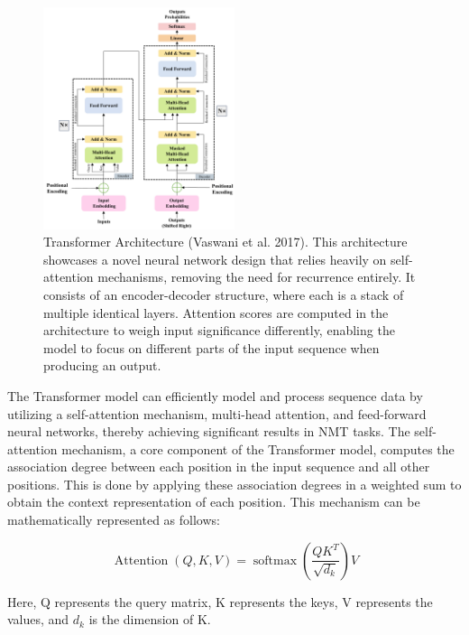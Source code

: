 \documentclass[acmsmall]{acmart}
\begin{document}
\begin{figure}[htbp]
\centering
\includegraphics[width=0.5\textwidth]{trans.pdf}
\caption{Transformer Architecture (Vaswani et al. 2017). This architecture showcases a novel neural network design that relies heavily on self-attention mechanisms, removing the need for recurrence entirely. It consists of an encoder-decoder structure, where each is a stack of multiple identical layers. Attention scores are computed in the architecture to weigh input significance differently, enabling the model to focus on different parts of the input sequence when producing an output.}
\label{fig:one} %
\end{figure}

The Transformer model can efficiently model and process sequence data by utilizing a self-attention mechanism, multi-head attention, and feed-forward neural networks, thereby achieving significant results in NMT tasks. The self-attention mechanism, a core component of the Transformer model, computes the association degree between each position in the input sequence and all other positions. This is done by applying these association degrees in a weighted sum to obtain the context representation of each position. This mechanism can be mathematically represented as follows:

\begin{equation}
\operatorname{Attention}(Q, K, V)=\operatorname{softmax}\left(\frac{Q K^T}{\sqrt{d_k}}\right) V
\end{equation}

Here, Q represents the query matrix, K represents the keys, V represents the values, and $d_k$ is the dimension of K.
\end{document}

